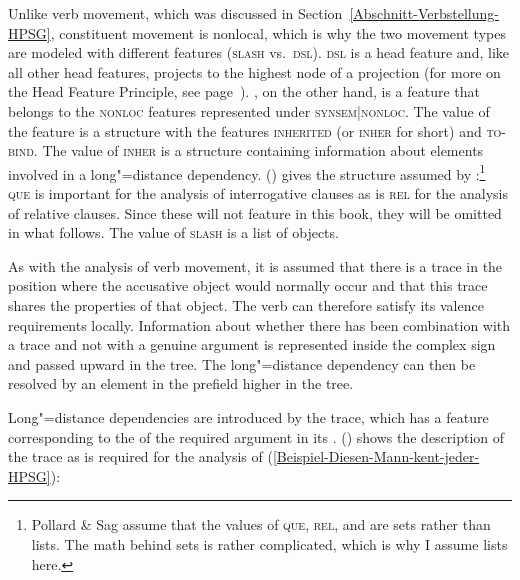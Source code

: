 Unlike verb movement, which was discussed in Section~\ref{Abschnitt-Verbstellung-HPSG}, constituent movement is nonlocal, which is why
the two movement types are modeled with different features (\textsc{slash} vs.\ \textsc{dsl}).
\textsc{dsl} is a head feature and, like all other head features, projects to the highest node of a projection (for more on the Head Feature Principle,
see page~\pageref{prinzip-hfp}). \slasch, on the other hand, is a feature that belongs to the \textsc{nonloc} features represented under \textsc{synsem|nonloc}. The value of the \nonloc feature is a structure with the features \textsc{inherited} (or \textsc{inher} for short) and 
\textsc{to-bind}. The value of \textsc{inher} is a structure containing information about elements involved in a long"=distance dependency.
() gives the structure assumed by \citet[]{ps2}:\footnote{
  Pollard \& Sag assume that the values of \textsc{que}, \textsc{rel}, and \slasch are sets rather
  than lists. The math behind sets is rather complicated, which is why I assume lists here.
}
\ea
{}
\z
\textsc{que} is important for the analysis of interrogative clauses as is \textsc{rel} for the analysis of relative
clauses. Since these will not feature in this book, they will be omitted in what follows. The value of \textsc{slash}
is a list of  objects.

As with the analysis of verb movement, it is assumed that there is a
trace in the position where the accusative object would normally occur and that this trace shares the properties of that object. The verb can therefore satisfy its valence requirements locally. Information about whether
there has been combination with a trace and not with a genuine argument is represented inside the complex sign and passed upward in the tree.
The long"=distance dependency can then be resolved by an element in the prefield higher in the tree.

Long"=distance dependencies are introduced by the trace, which has a feature corresponding to the \localv of the required argument in its \slashl.
() shows the description of the trace as is required for the analysis of (\ref{Beispiel-Diesen-Mann-kent-jeder-HPSG}):

